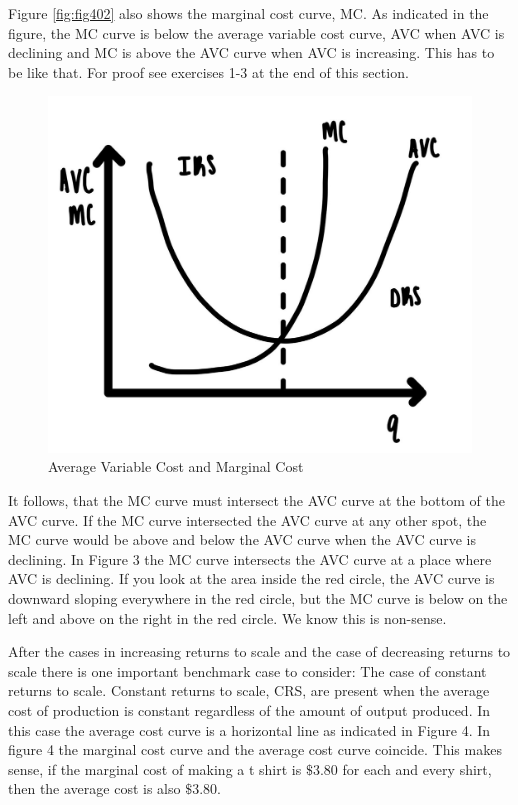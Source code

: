 \documentclass[
]{book}
\begin{document}
Figure \ref{fig:fig402} also shows the marginal cost curve, MC. As indicated in the figure, the MC curve is below the average variable cost curve, AVC when AVC is declining and MC is above the AVC curve when AVC is increasing. This has to be like that. For proof see exercises 1-3 at the end of this section.

\begin{figure}

{\centering \includegraphics[width=0.75\linewidth]{img/ch4/fig3} 

}

\caption{Average Variable Cost and Marginal Cost}\label{fig:fig403}
\end{figure}

It follows, that the MC curve must intersect the AVC curve at the bottom of the AVC curve. If the MC curve intersected the AVC curve at any other spot, the MC curve would be above and below the AVC curve when the AVC curve is declining. In Figure 3 the MC curve intersects the AVC curve at a place where AVC is declining. If you look at the area inside the red circle, the AVC curve is downward sloping everywhere in the red circle, but the MC curve is below on the left and above on the right in the red circle. We know this is non-sense.

After the cases in increasing returns to scale and the case of decreasing returns to scale there is one important benchmark case to consider: The case of constant returns to scale.
Constant returns to scale, CRS, are present when the average cost of production is constant regardless of the amount of output produced. In this case the average cost curve is a horizontal line as indicated in Figure 4. In figure 4 the marginal cost curve and the average cost curve coincide. This makes sense, if the marginal cost of making a t shirt is \(\$3.80\) for each and every shirt, then the average cost is also \(\$3.80\).
\end{document}
